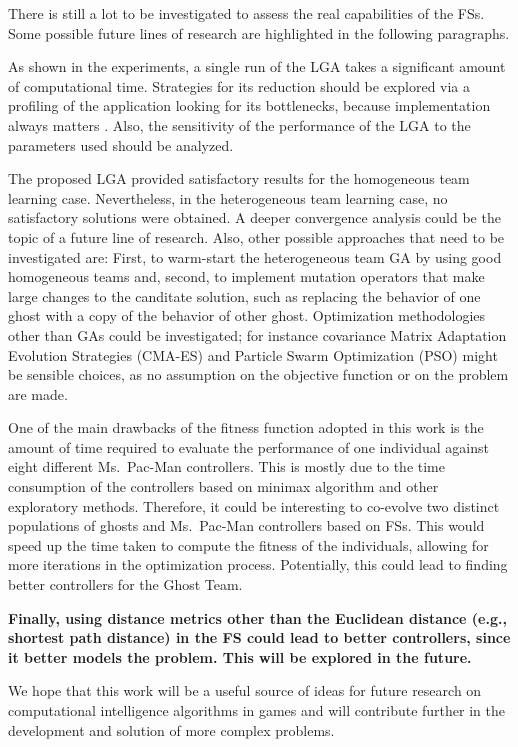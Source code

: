 \documentclass[journal]{IEEEtran}
\begin{document}
There is still a lot to be investigated to assess the real
capabilities of the FSs. Some possible future lines of research are
highlighted in the following paragraphs.

As shown in the experiments, a single run of the LGA takes a
significant amount of computational time. Strategies for its reduction
should be explored via a profiling of the application looking for its
bottlenecks, because implementation always matters
\cite{DBLP:conf/iwann/MereloRACML11}.  Also, the sensitivity of the
performance of the LGA to the parameters used should be analyzed. 

The proposed LGA provided satisfactory results for the homogeneous
team learning case. Nevertheless, in the heterogeneous team learning
case, no satisfactory solutions were obtained. A deeper convergence
analysis could be the topic of a future line of research. Also, other
possible approaches that need to be investigated are: First, to
warm-start the heterogeneous team GA by using good homogeneous teams
and, second, to implement mutation operators that make large changes
to the canditate solution, such as replacing the behavior of one ghost
with a copy of the behavior of other ghost.  Optimization
methodologies other than GAs could be investigated; for instance
covariance Matrix Adaptation Evolution Strategies (CMA-ES) and
Particle Swarm Optimization (PSO) might be sensible choices, as no
assumption on the objective function or on the problem are made. 

One of the main drawbacks of the fitness function adopted in this work is the amount of time required to evaluate the performance of one individual against eight different Ms.\  Pac-Man controllers. This is mostly due to the time consumption of the controllers based on minimax algorithm and other exploratory methods. Therefore, it could be interesting to co-evolve two distinct populations of ghosts and Ms.\  Pac-Man controllers based on FSs. This would speed up the time taken to compute the fitness of the individuals, allowing for more iterations in the optimization process. Potentially, this could lead to finding better controllers for the Ghost Team.

\textbf{Finally, using distance metrics other than the Euclidean
  distance (e.g., shortest path distance) in the FS could lead to
  better controllers, since it better models the problem. This will be
explored in the future.}

We hope that this work will be a useful source of ideas for future research on computational intelligence algorithms in games and will contribute further in the development and solution of more complex problems.
\end{document}
